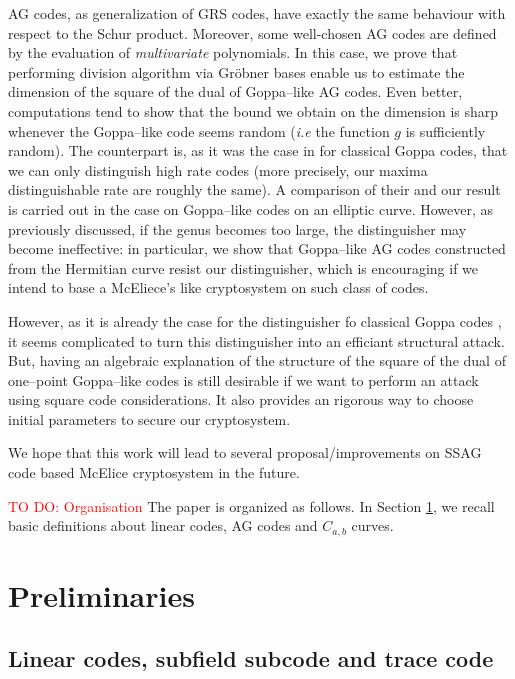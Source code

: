 \documentclass[a4paper]{article}
\theoremstyle{definition}
\theoremstyle{remark}
\newcommand\TODO[1]{\textcolor{red}{TO DO: #1}}
\begin{document}
AG codes, as generalization of GRS codes, have exactly the same behaviour with respect to the Schur product. Moreover, some well-chosen AG codes are defined by the evaluation of \textit{multivariate} polynomials. In this case, we prove that performing division algorithm via Gröbner bases enable us to estimate the dimension of the square of the dual of Goppa--like AG codes. Even better, computations tend to show that the bound we obtain on the dimension is sharp whenever the Goppa--like code seems random (\emph{i.e} the function $g$ is sufficiently random). The counterpart is, as it was the case in \cite{MT21} for classical Goppa codes, that we can only distinguish high rate codes (more precisely, our maxima distinguishable rate are roughly the same). A comparison of their and our result is carried out in the case on Goppa--like codes on an elliptic curve. However, as previously discussed, if the genus becomes too large, the distinguisher may become ineffective: in particular, we show that Goppa--like AG codes constructed from the Hermitian curve resist our distinguisher, which is encouraging if we intend to base a McEliece's like cryptosystem on such class of codes.

However, as it is already the case for the distinguisher fo classical Goppa codes \cite{MT21}, it seems complicated to turn this distinguisher into an efficiant structural attack. But, having an algebraic explanation of the structure of the square of the dual of one--point Goppa--like codes is still desirable if we want to perform an attack using square code considerations. It also provides an rigorous way to choose initial parameters to secure our cryptosystem.

We hope that this work will lead to several proposal/improvements on SSAG code based McElice cryptosystem in the future.

\TODO{Organisation}
The paper is organized as follows. In Section \ref{sec:preli}, we recall basic definitions about linear codes, AG codes and $C_{a,b}$ curves.


\section{Preliminaries}\label{sec:preli}

\subsection{Linear codes, subfield subcode and trace code}
\end{document}
